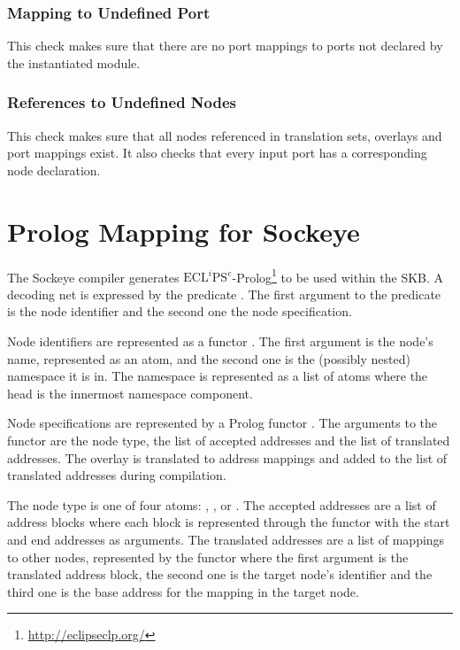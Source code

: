 \documentclass[a4paper,11pt,twoside]{report}
\begin{document}
{{{\subsection{Mapping to Undefined Port}
This check makes sure that there are no port mappings to ports not declared by the instantiated module.

\subsection{References to Undefined Nodes}
This check makes sure that all nodes referenced in translation sets, overlays and port mappings exist.
It also checks that every input port has a corresponding node declaration.


\chapter{Prolog Mapping for Sockeye}
\label{chap:prolog}
The Sockeye compiler generates \(\text{ECL}^i\text{PS}^e\)-Prolog\footnote{\href{http://eclipseclp.org/}{http://eclipseclp.org/}} to be used within the SKB.
A decoding net is expressed by the predicate .
The first argument to the predicate is the node identifier and the second one the node specification.

Node identifiers are represented as a functor .
The first argument is the node's name, represented as an atom, and the second one is the (possibly nested) namespace it is in.
The namespace is represented as a list of atoms where the head is the innermost namespace component.

Node specifications are represented by a Prolog functor .
The arguments to the functor are the node type, the list of accepted addresses and the list of translated addresses.
The overlay is translated to address mappings and added to the list of translated addresses during compilation.

The node type is one of four atoms: , ,  or .
The accepted addresses are a list of address blocks where each block is represented through the functor  with the start and end addresses as arguments.
The translated addresses are a list of mappings to other nodes, represented by the functor  where the first argument is the translated address block, the second one is the target node's identifier and the third one is the base address for the mapping in the target node.

}}}
\end{document}
